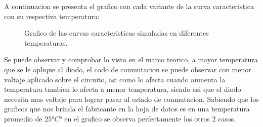 \documentclass[chaptersright]{informeutn}
\begin{document}
      A continuacion se presenta el grafico con cada variante de la curva caracteristica con su respectiva temperatura:
      \begin{figure}[H]
        \centering
        \caption{Grafico de las curvas caracteristicas simuladas en diferentes temperaturas.}
        \label{graph.simulation.temperatura}
      \end{figure}

      Se puede observar y comprobar lo visto en el marco teorico, a mayor temperatura que se le aplique al diodo,
      el codo de conmutacion se puede observar con menor voltaje aplicado sobre el circuito, asi como lo afecta
      cuando aumenta la temperatura tambien lo afecta a menor temperatura, siendo asi que el diodo necesita mas
      voltaje para lograr pasar al estado de conmutacion. Sabiendo que los graficos que nos brinda el
      fabricante en la hoja de datos es en una temperatura promedio de 25$°C°$ en el grafico se observa
      perfectamente  los otros 2 casos.
\end{document}
